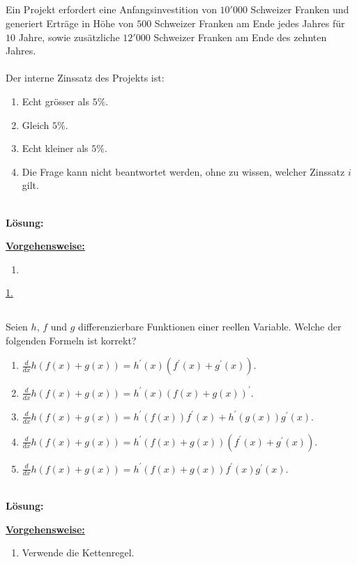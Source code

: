 \subsection*{}
Ein Projekt erfordert eine Anfangsinvestition von $10'000$ Schweizer Franken und generiert Erträge in Höhe von $500$ Schweizer Franken am Ende jedes Jahres für $10$ Jahre, sowie zusätzliche $12'000$ Schweizer Franken am Ende des zehnten Jahres.\\
\\
Der interne Zinssatz des Projekts ist:
\renewcommand{\labelenumi}{(\alph{enumi})}
\begin{enumerate}
	\item 
	Echt grösser als $5 \%$.
	\item 
	Gleich $5 \%$.
	\item
	Echt kleiner als $5 \%$.
	\item
	Die Frage kann nicht beantwortet werden, ohne zu wissen, welcher Zinssatz $i$ gilt.
\end{enumerate}
\ \\
\textbf{Lösung:}
\begin{mdframed}
\underline{\textbf{Vorgehensweise:}}
\renewcommand{\labelenumi}{\theenumi.}
\begin{enumerate}
\item 
\end{enumerate}
\end{mdframed}

\underline{1. }\\



 \newpage

\subsection*{}
Seien $h$, $f$ und $g$ differenzierbare Funktionen einer reellen Variable. Welche der folgenden Formeln ist korrekt?
\renewcommand{\labelenumi}{(\alph{enumi})}
\begin{enumerate}
	\item 
	$ \frac{d}{dx}h(f(x) + g(x)) = h^\prime(x) ( f^\prime(x) + g^\prime(x))$.
	\item 
	$ \frac{d}{dx}h(f(x) + g(x)) = h^\prime(x) ( f(x) + g(x))^\prime$.
	\item
	$ \frac{d}{dx}h(f(x) + g(x)) = h^\prime(f(x))  f^\prime(x) + h^\prime(g(x)) g^\prime(x)$.
	\item
	$ \frac{d}{dx}h(f(x) + g(x)) = h^\prime(f(x) + g(x))  (f^\prime(x) +  g^\prime(x) )$.
	\item
	$ \frac{d}{dx}h(f(x) + g(x)) = h^\prime(f(x) + g(x))  f^\prime(x)  g^\prime(x)$.
\end{enumerate}
\ \\
\textbf{Lösung:}
\begin{mdframed}
\underline{\textbf{Vorgehensweise:}}
\renewcommand{\labelenumi}{\theenumi.}
\begin{enumerate}
\item Verwende die Kettenregel.
\end{enumerate}
\end{mdframed}

